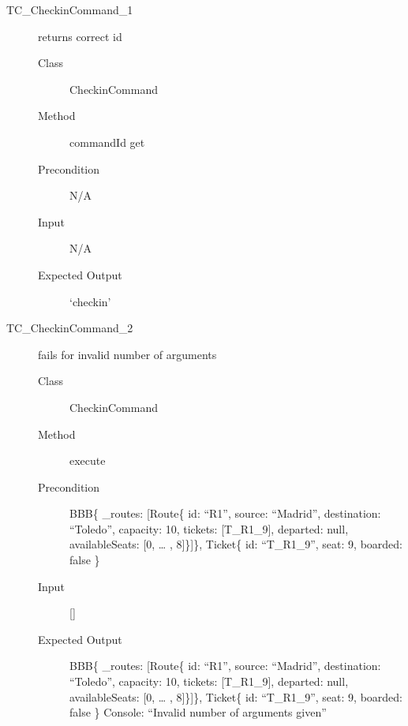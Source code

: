\documentclass[11pt]{article}
\begin{document}
\begin{description}
\item[{TC\_CheckinCommand\_1}] returns correct id
\begin{description}
\item[{Class}] CheckinCommand
\item[{Method}] commandId get
\item[{Precondition}] N/A
\item[{Input}] N/A
\item[{Expected Output}] ‘checkin’
\end{description}
\end{description}


\begin{description}
\item[{TC\_CheckinCommand\_2}] fails for invalid number of arguments
\begin{description}
\item[{Class}] CheckinCommand
\item[{Method}] execute
\item[{Precondition}] BBB\{ \_routes: [Route\{ id: “R1”, source: “Madrid”, destination: “Toledo”, capacity: 10,  tickets: [T\_R1\_9], departed: null, availableSeats: [0, … , 8]\}]\}, Ticket\{ id: “T\_R1\_9”, seat: 9, boarded: false \}
\item[{Input}] []
\item[{Expected Output}] BBB\{ \_routes: [Route\{ id: “R1”, source: “Madrid”, destination: “Toledo”, capacity: 10,  tickets: [T\_R1\_9], departed: null, availableSeats: [0, … , 8]\}]\}, Ticket\{ id: “T\_R1\_9”, seat: 9, boarded: false \}
Console: “Invalid number of arguments given”
\end{description}
\end{description}
\end{document}
